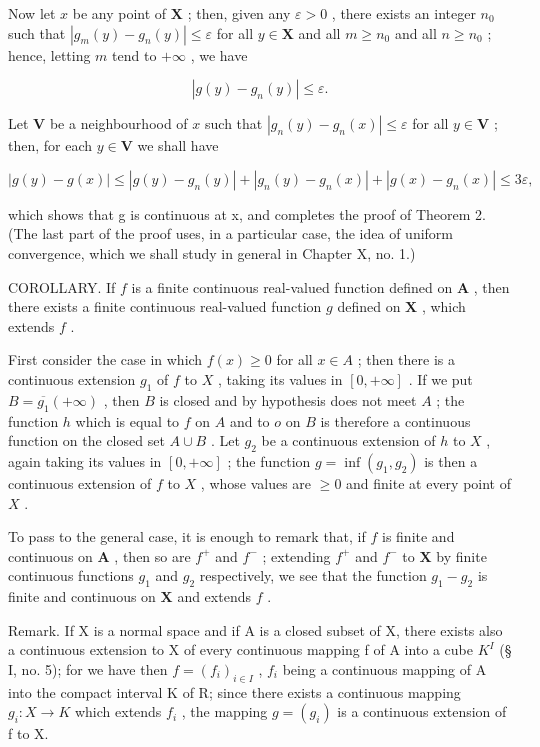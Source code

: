 Now let \(x\) be any point of \(\mathbf{X}\) ; then, given any \(\varepsilon > 0\) , there exists an integer \(n_0\) such that \(|g_m(y) - g_n(y)| \leqslant \varepsilon\) for all \(y \in \mathbf{X}\) and all \(m \geqslant n_0\) and all \(n \geqslant n_0\) ; hence, letting \(m\) tend to \(+\infty\) , we have

\[
\left| g (y) - g _ {n} (y) \right| \leqslant \varepsilon .
\]

Let \(\mathbf{V}\) be a neighbourhood of \(x\) such that \(|g_n(y) - g_n(x)| \leqslant \varepsilon\) for all \(y \in \mathbf{V}\) ; then, for each \(y \in \mathbf{V}\) we shall have

\[
\left| g (y) - g (x) \right| \leqslant \left| g (y) - g _ {n} (y) \right| + \left| g _ {n} (y) - g _ {n} (x) \right| + \left| g (x) - g _ {n} (x) \right| \leqslant 3 \varepsilon ,
\]

which shows that g is continuous at x, and completes the proof of Theorem 2. (The last part of the proof uses, in a particular case, the idea of uniform convergence, which we shall study in general in Chapter X, no. 1.)

COROLLARY. If \(f\) is a finite continuous real-valued function defined on \(\mathbf{A}\) , then there exists a finite continuous real-valued function \(g\) defined on \(\mathbf{X}\) , which extends \(f\) .

First consider the case in which \(f(x) \geqslant 0\) for all \(x \in A\) ; then there is a continuous extension \(g_1\) of \(f\) to \(X\) , taking its values in \([0, +\infty]\) . If we put \(B = \overline{g_1} (+\infty)\) , then \(B\) is closed and by hypothesis does not meet \(A\) ; the function \(h\) which is equal to \(f\) on \(A\) and to \(o\) on \(B\) is therefore a continuous function on the closed set \(A \cup B\) . Let \(g_2\) be a continuous extension of \(h\) to \(X\) , again taking its values in \([0, +\infty]\) ; the function \(g = \inf(g_1, g_2)\) is then a continuous extension of \(f\) to \(X\) , whose values are \(\geqslant 0\) and finite at every point of \(X\) .

To pass to the general case, it is enough to remark that, if \(f\) is finite and continuous on \(\mathbf{A}\) , then so are \(f^{+}\) and \(f^{-}\) ; extending \(f^{+}\) and \(f^{-}\) to \(\mathbf{X}\) by finite continuous functions \(g_{1}\) and \(g_{2}\) respectively, we see that the function \(g_{1} - g_{2}\) is finite and continuous on \(\mathbf{X}\) and extends \(f\) .

Remark. If X is a normal space and if A is a closed subset of X, there exists also a continuous extension to X of every continuous mapping f of A into a cube \(K^{I}\) (§ I, no. 5); for we have then \(f = (f_{i})_{i \in I}\) , \(f_{i}\) being a continuous mapping of A into the compact interval K of R; since there exists a continuous mapping \(g_{i}: X \to K\) which extends \(f_{i}\) , the mapping \(g = (g_{i})\) is a continuous extension of f to X.

